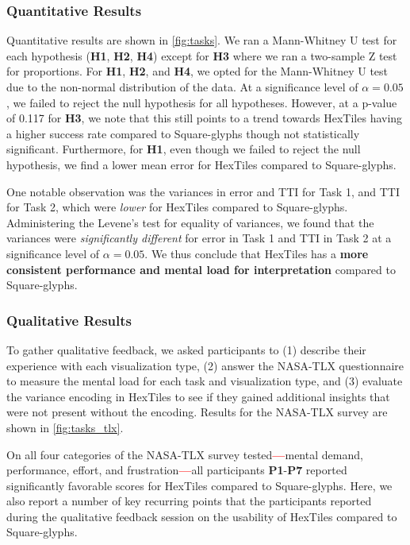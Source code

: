 \subsubsection{Quantitative Results}
Quantitative results are shown in \cref{fig:tasks}.
%
We ran a Mann-Whitney U test for each hypothesis (\textbf{H1}, \textbf{H2}, \textbf{H4}) except for \textbf{H3} where we ran a two-sample Z test for proportions.
%
For \textbf{H1}, \textbf{H2}, and \textbf{H4}, we opted for the Mann-Whitney U test due to the non-normal distribution of the data.
%
At a significance level of $\alpha = 0.05$, we failed to reject the null hypothesis for all hypotheses.
%
However, at a p-value of 0.117 for \textbf{H3}, we note that this still points to a trend towards HexTiles having a higher success rate compared to Square-glyphs though not statistically significant.
%
Furthermore, for \textbf{H1}, even though we failed to reject the null hypothesis, we find a lower mean error for HexTiles compared to Square-glyphs.

One notable observation was the variances in error and TTI for Task 1, and TTI for Task 2, which were \textit{lower} for HexTiles compared to Square-glyphs.
%
Administering the Levene's test for equality of variances, we found that the variances were \textit{significantly different} for error in Task 1 and TTI in Task 2 at a significance level of $\alpha = 0.05$.
%
We thus conclude that HexTiles has a \textbf{more consistent performance and mental load for interpretation} compared to Square-glyphs.

\subsubsection{Qualitative Results}
To gather qualitative feedback, we asked participants to (1) describe their experience with each visualization type, (2) answer the NASA-TLX questionnaire to measure the mental load for each task and visualization type, and (3) evaluate the variance encoding in HexTiles to see if they gained additional insights that were not present without the encoding.
%
Results for the NASA-TLX survey are shown in \cref{fig:tasks_tlx}.

On all four categories of the NASA-TLX survey tested\textcolor{red}{\textbf{---}}mental demand, performance, effort, and frustration\textcolor{red}{\textbf{---}}all participants \textbf{P1}-\textbf{P7} reported significantly favorable scores for HexTiles compared to Square-glyphs.
%
Here, we also report a number of key recurring points that the participants reported during the qualitative feedback session on the usability of HexTiles compared to Square-glyphs.


